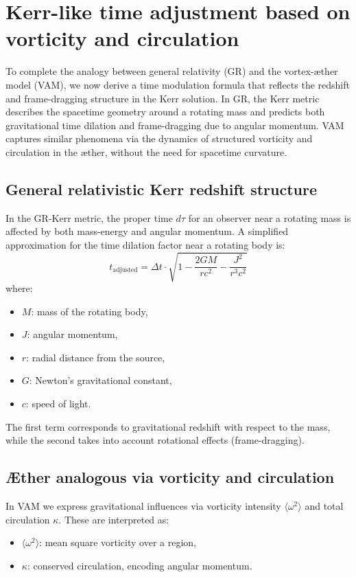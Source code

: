 \section{Kerr-like time adjustment based on vorticity and circulation}

To complete the analogy between general relativity (GR) and the vortex-æther model (VAM), we now derive a time modulation formula that reflects the redshift and frame-dragging structure in the Kerr solution. In GR, the Kerr metric describes the spacetime geometry around a rotating mass and predicts both gravitational time dilation and frame-dragging due to angular momentum. VAM captures similar phenomena via the dynamics of structured vorticity and circulation in the æther, without the need for spacetime curvature.

\subsection{General relativistic Kerr redshift structure}

In the GR-Kerr metric, the proper time $d\tau$ for an observer near a rotating mass is affected by both mass-energy and angular momentum. A simplified approximation for the time dilation factor near a rotating body is:
\begin{equation}
    t_{\text{adjusted}} = \Delta t \cdot \sqrt{1 - \frac{2GM}{rc^2} - \frac{J^2}{r^3c^2}}
    \label{eq:Kerr_time_dilation}
\end{equation}
where:
\begin{itemize}
    \item $M$: mass of the rotating body,
    \item $J$: angular momentum,
    \item $r$: radial distance from the source,
    \item $G$: Newton's gravitational constant,
    \item $c$: speed of light.
\end{itemize}

The first term corresponds to gravitational redshift with respect to the mass, while the second takes into account rotational effects (frame-dragging).

\subsection{Æther analogous via vorticity and circulation}

In VAM we express gravitational influences via vorticity intensity $\langle \omega^2 \rangle$ and total circulation $\kappa$. These are interpreted as:
\begin{itemize}
    \item $\langle \omega^2 \rangle$: mean square vorticity over a region,
    \item $\kappa$: conserved circulation, encoding angular momentum.

\end{itemize}

